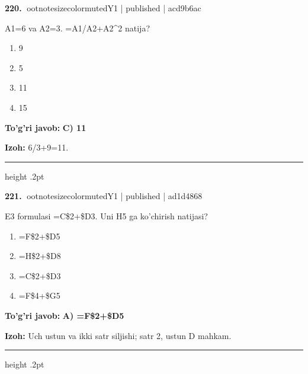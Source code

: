 \documentclass[10pt,a4paper]{article}
\begin{document}
\textbf{\color{ink}220.} {ootnotesizecolor{muted}Y1 | published | acd9b6ac}
\par
A1=6 va A2=3. =A1/A2+A2\textasciicircum{}2 natija?
\begin{enumerate}[label=\Alph*),leftmargin=9mm]
\item 9
\item 5
\item 11
\item 15
\end{enumerate}
\begin{tcolorbox}[enhanced,breakable,colback=teal!4,colframe=teal!55!black,boxrule=0.45pt,arc=1.2mm,left=2.8mm,right=2.8mm,top=2mm,bottom=2mm]
\textbf{\color{teal}To'g'ri javob:} \textbf{C) 11}
\par\smallskip
\textbf{Izoh:} 6/3+9=11.
\end{tcolorbox}
\vspace{2mm}\hrule height .2pt\vspace{2mm}

\textbf{\color{ink}221.} {ootnotesizecolor{muted}Y1 | published | ad1d4868}
\par
E3 formulasi =C\$2+\$D3. Uni H5 ga ko'chirish natijasi?
\begin{enumerate}[label=\Alph*),leftmargin=9mm]
\item =F\$2+\$D5
\item =H\$2+\$D8
\item =C\$2+\$D3
\item =F\$4+\$G5
\end{enumerate}
\begin{tcolorbox}[enhanced,breakable,colback=teal!4,colframe=teal!55!black,boxrule=0.45pt,arc=1.2mm,left=2.8mm,right=2.8mm,top=2mm,bottom=2mm]
\textbf{\color{teal}To'g'ri javob:} \textbf{A) =F\$2+\$D5}
\par\smallskip
\textbf{Izoh:} Uch ustun va ikki satr siljishi; satr 2, ustun D mahkam.
\end{tcolorbox}
\vspace{2mm}\hrule height .2pt\vspace{2mm}
\end{document}

